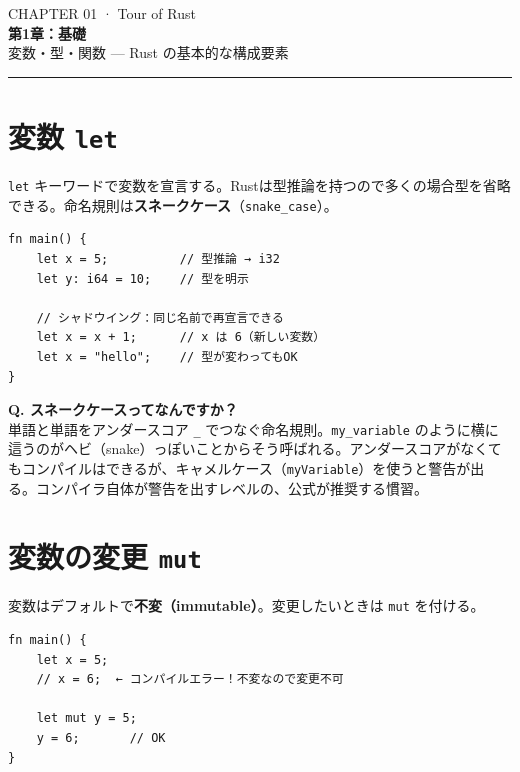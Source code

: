 \documentclass[12pt,a4paper]{article}
\begin{document}
\begin{center}
  {\small\ttfamily\color{codered} CHAPTER 01 · Tour of Rust}\\[6pt]
  {\LARGE\bfseries 第1章：基礎}\\[4pt]
  {\small\color{gray} 変数・型・関数 — Rust の基本的な構成要素}
\end{center}

\vspace{2mm}\hrule\vspace{6mm}

\section{変数 \texttt{let}}

\texttt{let} キーワードで変数を宣言する。Rustは型推論を持つので多くの場合型を省略できる。命名規則は\textbf{スネークケース}（\texttt{snake\_case}）。

\begin{lstlisting}
fn main() {
    let x = 5;          // 型推論 → i32
    let y: i64 = 10;    // 型を明示

    // シャドウイング：同じ名前で再宣言できる
    let x = x + 1;      // x は 6（新しい変数）
    let x = "hello";    // 型が変わってもOK
}
\end{lstlisting}

\begin{qabox}
\textbf{Q. スネークケースってなんですか？}\\
単語と単語をアンダースコア \texttt{\_} でつなぐ命名規則。\texttt{my\_variable} のように横に這うのがヘビ（snake）っぽいことからそう呼ばれる。アンダースコアがなくてもコンパイルはできるが、キャメルケース（\texttt{myVariable}）を使うと警告が出る。コンパイラ自体が警告を出すレベルの、公式が推奨する慣習。
\end{qabox}

\section{変数の変更 \texttt{mut}}

変数はデフォルトで\textbf{不変（immutable）}。変更したいときは \texttt{mut} を付ける。

\begin{lstlisting}
fn main() {
    let x = 5;
    // x = 6;  ← コンパイルエラー！不変なので変更不可

    let mut y = 5;
    y = 6;       // OK
}
\end{lstlisting}
\end{document}
